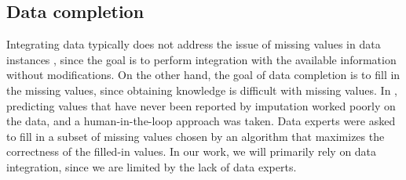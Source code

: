 \subsection{Data completion}

Integrating data typically does not address the issue of missing values in data instances \cite{Miller2018MakingOD}, since the goal is to perform integration with the available information without modifications. On the other hand, the goal of data completion is to fill in the missing values, since obtaining knowledge is difficult with missing values. In \cite{Wilkinson2016FAIR}, predicting values that have never been reported by imputation worked poorly on the data, and a human-in-the-loop approach was taken. Data experts were asked to fill in a subset of missing values chosen by an algorithm that maximizes the correctness of the filled-in values. In our work, we will primarily rely on data integration, since we are limited by the lack of data experts.
\endinput